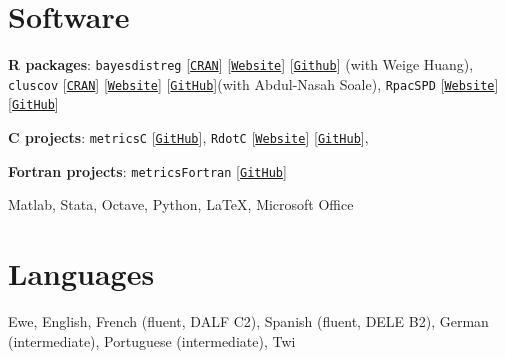 \documentclass[12pt,letterpaper]{article}
\renewenvironment{itemize}{
  \begin{list}{}{
    \setlength{\leftmargin}{1.5em}
  }
}{
  \end{list}
}
\begin{document}
\section*{Software}
\begin{itemize}
  \item \textbf{R packages}: \texttt{bayesdistreg} [\texttt{\href{https://CRAN.R-project.org/package=bayesdistreg}{CRAN}}] [\texttt{\href{https://estsyawo.github.io/bayesdistreg/}{Website}}] [\texttt{\href{https://github.com/estsyawo/bayesdistreg}{Github}}] (with Weige Huang), \texttt{cluscov} [\texttt{\href{https://CRAN.R-project.org/package=cluscov}{CRAN}}] [\texttt{\href{https://estsyawo.github.io/cluscov/}{Website}}] [\texttt{\href{https://github.com/estsyawo/cluscov}{GitHub}}](with Abdul-Nasah Soale), \texttt{RpacSPD} [\texttt{\href{https://estsyawo.github.io/RpacSPD/}{Website}}] [\texttt{\href{https://github.com/estsyawo/RpacSPD}{GitHub}}]

  \item \textbf{C projects}: \texttt{metricsC} [\texttt{\href{https://github.com/estsyawo/metricsC}{GitHub}}], \texttt{RdotC} [\texttt{\href{https://estsyawo.github.io/RdotC/index.html}{Website}}] [\texttt{\href{https://github.com/estsyawo/RdotC}{GitHub}}], 
  
  \item \textbf{Fortran projects}: \texttt{metricsFortran} [\texttt{\href{https://github.com/estsyawo/metricsFortran}{GitHub}}]
  \item Matlab,  Stata, Octave, Python, \LaTeX, Microsoft Office
\end{itemize}

\section*{Languages}
Ewe, English, French (fluent, DALF C2), Spanish (fluent, DELE B2), German (intermediate),  Portuguese (intermediate), Twi
\end{document}
